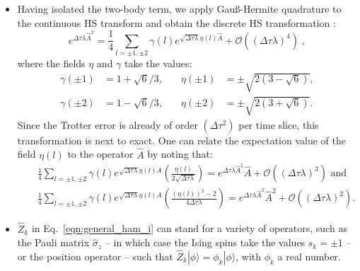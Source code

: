 \begin{itemize}
There has also been progress in efficient continuous-time methods using techniques that draw from the Stochastic Series Expansion \cite{Wang16} which can be combined with fermion bag ideas \cite{Huffman17}. However, these techniques are even more restricted to a specific class of Hamiltonians, those that can be expressed as sums of exponentiated fermionic bilinear terms $\hat{H} = \sum_i \hat{h}^{(i)}$, where
\begin{equation}
\hat{h}^{(i)} = -\gamma^{(i)} e^{\sum_{jk} \alpha^{(i)}_{jk} \hat{c}^\dagger_j  \hat{c}_k + \hc }
\end{equation}
Stabilization can also be costly depending on the parameters, particularly for large $\alpha$ values \cite{huffman2019}.
\item  Having isolated the two-body term, we apply Gau\ss{}-Hermite quadrature \cite{goth2020} to the 
continuous HS transform and obtain the discrete HS transformation \cite{Motome97,Assaad97}:
\begin{equation}
\label{HS_squares}
        e^{\Delta \tau  \lambda  \hat{A}^2 } = \frac{1}{4}
        \sum_{ l = \pm 1, \pm 2}  \gamma(l)
e^{ \sqrt{\Delta \tau \lambda }
       \eta(l)  \hat{A} }
                + \mathcal{O} \left(  (\Delta \tau \lambda)^4\right) \;,
\end{equation}
where the fields $\eta$ and $\gamma$ take the values:
\begin{equation} \label{eta_gamma_fields}
\begin{aligned}
\gamma(\pm 1) &= 1 + \sqrt{6}/3, \quad & \eta(\pm 1 ) &= \pm \sqrt{2 \left(3 - \sqrt{6} \right)},\\
\gamma(\pm 2) &= 1 - \sqrt{6}/3, \quad & \eta(\pm 2 ) &= \pm \sqrt{2 \left(3 + \sqrt{6} \right)}.
\end{aligned}
\end{equation}
Since the Trotter error is already of order $(\Delta \tau ^2) $ per time slice, this transformation is next to exact.
One can relate the expectation value of the field $\eta(l)$ to the operator $\hat{A}$  by noting that:
\begin{eqnarray} 
    & &  \frac{1}{4} \sum_{l = \pm 1, \pm 2} \gamma(l) e^{\sqrt{ \Delta \tau \lambda} \eta(l) \hat{A}} \left( \frac{\eta(l)}{2 \sqrt{ \Delta \tau \lambda}  } \right)    =   e^{ \Delta \tau \lambda  \hat{A}^2}  \hat{A}  +   \mathcal{O}  \left( (\Delta \tau \lambda)^3\right)   \text{  and } \nonumber \\  
     & &    \frac{1}{4} \sum_{l = \pm 1, \pm 2} \gamma(l) e^{\sqrt{ \Delta \tau \lambda} \eta(l) \hat{A}} \left( \frac{(\eta(l))^2 - 2}{4 \Delta \tau \lambda  } \right)    =   e^{ \Delta \tau \lambda  \hat{A}^2}  \hat{A}^2  +   \mathcal{O}  \left( (\Delta \tau \lambda)^2\right).
\end{eqnarray}
\item $\hat{Z}_k$ in Eq.~\eqref{eqn:general_ham_i} can stand for a variety of operators, such as the Pauli matrix $\hat{\sigma}_{z}$ -- in which case the Ising spins take the values $s_{k} = \pm 1$ -- or the position operator -- such that $ \hat{Z}_k | \phi\rangle = \phi_k  |\phi\rangle $, with $\phi_k$ a real number.  


\end{itemize}
